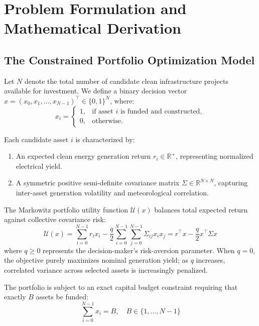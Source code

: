 \chapter{Problem Formulation and Mathematical Derivation}
\label{chap:problem-formulation}

\section{The Constrained Portfolio Optimization Model}
Let $N$ denote the total number of candidate clean infrastructure projects available for investment. We define a binary decision vector $x = (x_0, x_1, \dots, x_{N-1})^\top \in \{0, 1\}^N$, where:
\begin{equation}
x_i = \begin{cases}
1, & \text{if asset } i \text{ is funded and constructed}, \\
0, & \text{otherwise}.
\end{cases}
\end{equation}

Each candidate asset $i$ is characterized by:
\begin{enumerate}
    \item An expected clean energy generation return $r_i \in \mathbb{R}^+$, representing normalized electrical yield.
    \item A symmetric positive semi-definite covariance matrix $\Sigma \in \mathbb{R}^{N \times N}$, capturing inter-asset generation volatility and meteorological correlation.
\end{enumerate}

The Markowitz portfolio utility function $\mathcal{U}(x)$ balances total expected return against collective covariance risk:
\begin{equation}
\label{eq:markowitz_utility}
\mathcal{U}(x) = \sum_{i=0}^{N-1} r_i x_i - \frac{q}{2} \sum_{i=0}^{N-1}\sum_{j=0}^{N-1} \Sigma_{ij} x_i x_j = r^\top x - \frac{q}{2} x^\top \Sigma x
\end{equation}
where $q \ge 0$ represents the decision-maker's risk-aversion parameter. When $q = 0$, the objective purely maximizes nominal generation yield; as $q$ increases, correlated variance across selected assets is increasingly penalized.

The portfolio is subject to an exact capital budget constraint requiring that exactly $B$ assets be funded:
\begin{equation}
\label{eq:budget_constraint}
\sum_{i=0}^{N-1} x_i = B, \quad B \in \{1, \dots, N-1\}
\end{equation}

